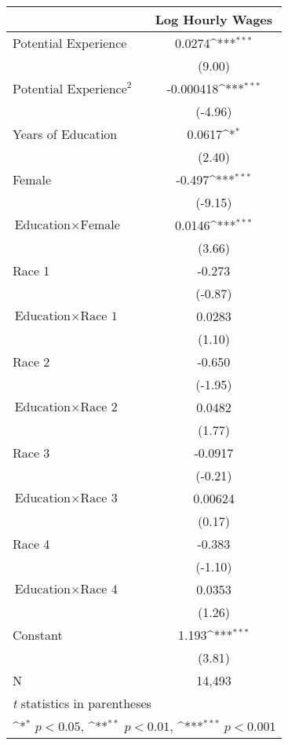 {
\def\sym#1{\ifmmode^{#1}\else\(^{#1}\)\fi}
\begin{tabular}{l*{1}{c}}
\hline\hline
                &\multicolumn{1}{c}{Log Hourly Wages}\\
\hline
Potential Experience&   0.0274\sym{***}\\
                &   (9.00)         \\
$\text{Potential Experience}^2$&-0.000418\sym{***}\\
                &  (-4.96)         \\
Years of Education&   0.0617\sym{*}  \\
                &   (2.40)         \\
Female          &   -0.497\sym{***}\\
                &  (-9.15)         \\
$\text{Education}\times \text{Female}$&   0.0146\sym{***}\\
                &   (3.66)         \\
Race 1          &   -0.273         \\
                &  (-0.87)         \\
$\text{Education}\times \text{Race 1}$&   0.0283         \\
                &   (1.10)         \\
Race 2          &   -0.650         \\
                &  (-1.95)         \\
$\text{Education}\times \text{Race 2}$&   0.0482         \\
                &   (1.77)         \\
Race 3          &  -0.0917         \\
                &  (-0.21)         \\
$\text{Education}\times \text{Race 3}$&  0.00624         \\
                &   (0.17)         \\
Race 4          &   -0.383         \\
                &  (-1.10)         \\
$\text{Education}\times \text{Race 4}$&   0.0353         \\
                &   (1.26)         \\
Constant        &    1.193\sym{***}\\
                &   (3.81)         \\
\hline
N               &   14,493         \\
\hline\hline
\multicolumn{2}{l}{\footnotesize \textit{t} statistics in parentheses}\\
\multicolumn{2}{l}{\footnotesize \sym{*} \(p<0.05\), \sym{**} \(p<0.01\), \sym{***} \(p<0.001\)}\\
\end{tabular}
}
